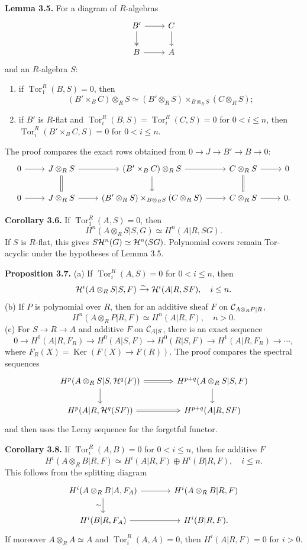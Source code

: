 \documentclass[11pt]{article}
\providecommand{\Tor}{\operatorname{Tor}}
\providecommand{\Ker}{\operatorname{Ker}}
\begin{document}
\textbf{Lemma 3.5.}  For a diagram of \(R\)-algebras
\[
\begin{tikzcd}
B' \arrow[r] \arrow[d,two heads] & C \arrow[d] \\
B \arrow[r] & A
\end{tikzcd}
\]
and an \(R\)-algebra \(S\):
\begin{enumerate}[label=\textup{(\roman*)}]
\item if \(\Tor^R_1(B,S)=0\), then
\[
(B'\times_BC)\otimes_RS \simeq (B'\otimes_RS)\times_{B\otimes_RS}(C\otimes_RS);
\]
\item if \(B'\) is \(R\)-flat and \(\Tor_i^R(B,S)=\Tor_i^R(C,S)=0\) for \(0<i\le n\), then \(\Tor_i^R(B'\times_BC,S)=0\) for \(0<i\le n\).
\end{enumerate}
The proof compares the exact rows obtained from \(0\to J\to B'\to B\to0\):
\[
\begin{tikzcd}
0\arrow[r]&J\otimes_RS\arrow[r]\arrow[d,equal]&(B'\times_BC)\otimes_RS\arrow[r]\arrow[d]&C\otimes_RS\arrow[r]\arrow[d,equal]&0\\
0\arrow[r]&J\otimes_RS\arrow[r]&(B'\otimes_RS)\times_{B\otimes_RS}(C\otimes_RS)\arrow[r]&C\otimes_RS\arrow[r]&0.
\end{tikzcd}
\]

\textbf{Corollary 3.6.}  If \(\Tor^R_1(A,S)=0\), then
\[
H^n(A\otimes_RS|S,G)\simeq H^n(A|R,SG).
\]
If \(S\) is \(R\)-flat, this gives \(S\mathcal H^n(G)\simeq\mathcal H^n(SG)\).  Polynomial covers remain Tor-acyclic under the hypotheses of Lemma 3.5.

\textbf{Proposition 3.7.}  (a) If \(\Tor_i^R(A,S)=0\) for \(0<i\le n\), then
\[
\mathcal H^i(A\otimes_RS|S,F)\xrightarrow{\sim}\mathcal H^i(A|R,SF),\quad i\le n.
\]
(b) If \(P\) is polynomial over \(R\), then for an additive sheaf \(F\) on \(\mathcal C_{A\otimes_RP|R}\),
\[
H^n(A\otimes_RP|R,F)\simeq H^n(A|R,F),\quad n>0.
\]
(c) For \(S\to R\to A\) and additive \(F\) on \(\mathcal C_{A|S}\), there is an exact sequence
\[
0\to H^0(A|R,F_R)\to H^0(A|S,F)\to H^0(R|S,F)\to H^1(A|R,F_R)\to\cdots,
\]
where \(F_R(X)=\Ker(F(X)\to F(R))\).  The proof compares the spectral sequences
\[
\begin{tikzcd}[column sep=large]
H^p(A\otimes_RS|S,\cH^q(F)) \arrow[r,Rightarrow] \arrow[d] & H^{p+q}(A\otimes_RS|S,F) \arrow[d] \\
H^p(A|R,\cH^q(SF)) \arrow[r,Rightarrow] & H^{p+q}(A|R,SF)
\end{tikzcd}
\]
and then uses the Leray sequence for the forgetful functor.

\textbf{Corollary 3.8.}  If \(\Tor_i^R(A,B)=0\) for \(0<i\le n\), then for additive \(F\)
\[
H^i(A\otimes_RB|R,F)\simeq H^i(A|R,F)\oplus H^i(B|R,F),\quad i\le n.
\]
This follows from the splitting diagram
\[
\begin{tikzcd}[column sep=large]
H^i(A\otimes_RB|A,F_A) \arrow[r] \arrow[d,"\sim"'] & H^i(A\otimes_RB|R,F) \\
H^i(B|R,F_A) \arrow[r] & H^i(B|R,F).
\end{tikzcd}
\]
If moreover \(A\otimes_RA\simeq A\) and \(\Tor_i^R(A,A)=0\), then \(H^i(A|R,F)=0\) for \(i>0\).
\end{document}
